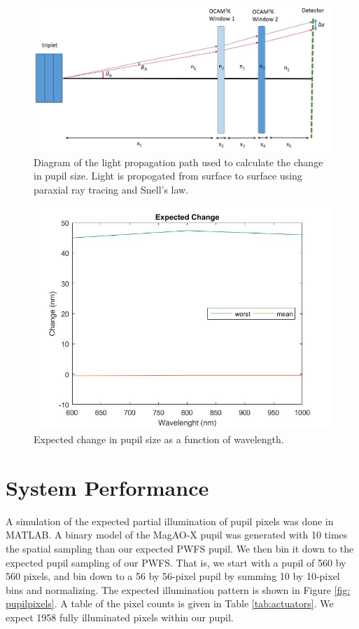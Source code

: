 	
	
	
\begin{figure}[h]
	\centering
	\includegraphics[width=.8\textwidth]{Chapter Materials/Chapter Three Materials/propagation.JPG}
	\caption{Diagram of the light propagation path used to calculate the change in pupil size. Light is propogated from surface to surface using paraxial ray tracing and Snell's law.}
	\label{fig:propagation}
\end{figure}
	
	
\begin{figure}[h]
	\centering
	\includegraphics[width=.5\textwidth]{Chapter Materials/Chapter Three Materials/achromaticchangegraph.jpg}
	\caption{Expected change in pupil size as a function of wavelength.}
	\label{fig:change}
\end{figure}
	
\section{System Performance}
	
A simulation of the expected partial illumination of pupil pixels was done in MATLAB. A binary model of the MagAO-X pupil was generated with 10 times the spatial sampling than our expected PWFS pupil. We then bin it down to the expected pupil sampling of our PWFS. That is, we start with a pupil of 560 by 560 pixels, and bin down to a 56 by 56-pixel pupil by summing 10 by 10-pixel bins and normalizing. The expected illumination pattern is shown in Figure \ref{fig: pupilpixels}. A table of the pixel counts is given in Table \ref{tab:actuators}. We expect 1958 fully illuminated pixels within our pupil. 
	
